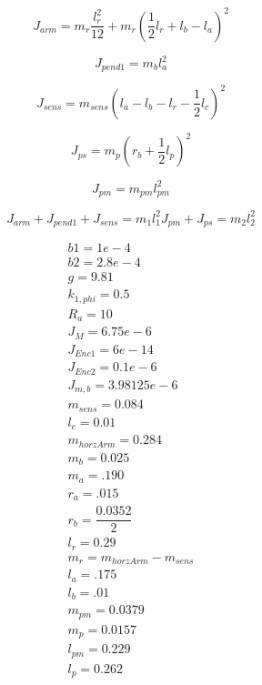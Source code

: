 \begin{equation}
J_{arm} = m_r \frac{l^2_r}{12}+m_r(\frac{1}{2}l_r+l_b-l_a)^2
\end{equation}

\begin{equation}
J_{pend1}=m_bl^2_a
\end{equation}

\begin{equation}
J_{sens}=m_{sens}(l_a-l_b-l_r-\frac{1}{2}l_c)^2
\end{equation}

\begin{equation}
J_{ps}=m_p(r_b+\frac{1}{2}l_p)^2
\end{equation}

\begin{equation}
J_{pm}=m_{pm}l^2_{pm}
\end{equation}

\begin{equation}
J_{arm}+J_{pend1}+J_{sens}=m_1l^2_1J_{pm}+J_{ps}=m_2l^2_2
\end{equation}


\begin{eqnarray}
b1=1e-4 \\
b2=2.8e-4 \\
g=9.81\\
k_{1,phi}=0.5\\
R_a=10\\
J_M = 6.75e-6  \\        %
J_{Enc1} = 6e-14 \\        %
J_{Enc2} = 0.1e-6  \\     %
J_{m,b} = 3.98125e-6 \\     %
m_{sens} = 0.084  \\
l_c = 0.01 \\
m_{horzArm}=0.284 \\
m_b=0.025 \\
m_a=.190 \\
r_a=.015 \\
r_b=\dfrac{0.0352}{2}\\
l_r=0.29\\
m_r = m_{horzArm} - m_{sens}\\
l_a=.175\\
l_b=.01\\
m_{pm}=0.0379\\
m_p=0.0157\\
l_{pm}=0.229\\
l_p=0.262\\
\end{eqnarray}


